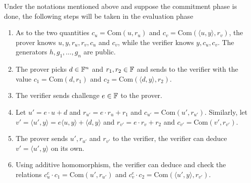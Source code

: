 \documentclass{article}
\begin{document}
\begin{boxx1} \label{def:eval-poly-commitment}
Under the notations mentioned above and suppose the commitment phase is done, the following steps will be taken in the evaluation phase 
\begin{enumerate}
\item\label{item:79} As to the two quantities $c_u = \text{Com}(u, r_u)$ and $c_{v} = \text{Com}(\langle u, y \rangle, r_v)$, the prover knows $u, y, r_u, r_v, c_u$ and $c_v$, while the verifier knows $y, c_u, c_v$. The generators $h, g_1, \dots, g_n$ are public. 
\item\label{item:80} The prover picks $d \in \mathbb{F}^n$ and $r_1, r_2 \in \mathbb{F}$ and sends to the verifier with the value $c_{1} = \text{Com}(d, r_1)$ and $c_2 = \text{Com}(\langle d, y \rangle, r_2)$. 
\item\label{item:81} The verifier sends challenge $e \in \mathbb{F}$ to the prover. 
\item\label{item:84} Let $u' = e \cdot u + d$ and $r_{u'} = e \cdot r_u + r_1$ and $c_{u'} = \text{Com}(u', r_{u'})$. Similarly, let $v' = \langle u', y \rangle = e \langle u, y \rangle + \langle d, y \rangle$ and $r_{v'} = e \cdot r_v + r_2$ and $c_{v'} = \text{Com}(v', r_{v'})$.  
\item\label{item:85} The prover sends $u', r_{u'}$ and $r_{v'}$ to the verifier, the verifier can deduce $v' = \langle u', y \rangle$ on its own. 
\item\label{item:86} Using additive homomorphism, the verifier can deduce and check the relations $c_u^e \cdot c_1  = \text{Com}(u', r_{u'})$ and $c_v^e \cdot c_2  = \text{Com}(\langle u', y \rangle, r_{v'})$.
\end{enumerate}
\end{boxx1}
\end{document}
